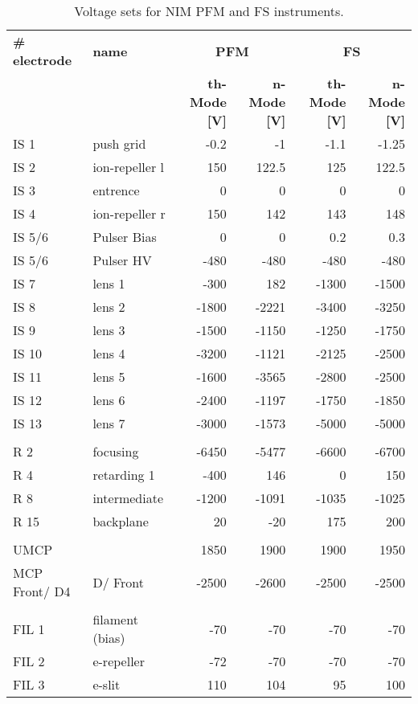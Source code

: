 	\begin{table}[H]
		\centering
		\begin{tabular}{|ll|rrrr|}
			\hline
			\textbf{\# electrode} & \textbf{name}   & \multicolumn{2}{c}{\textbf{PFM}} & \multicolumn{2}{c|}{\textbf{FS}} \\
			& & \textbf{th-Mode [V]} & \textbf{n-Mode [V]} & \textbf{th-Mode  [V]} & \textbf{n-Mode [V]} \\
			\hline
			IS 1          & push grid       &  -0.2 &    -1 &  -1.1 & -1.25 \\
			IS 2          & ion-repeller l  &   150 & 122.5 &   125 & 122.5 \\
			IS 3          & entrence        &    0 &      0 &     0 &     0 \\
			IS 4          & ion-repeller r  &   150 &   142 &   143 &   148 \\
			IS 5/6        & Pulser Bias     &     0 &     0 &   0.2 &   0.3 \\
			IS 5/6        & Pulser HV       &  -480 &  -480 &  -480 &  -480 \\
			IS 7          & lens 1          &  -300 &   182 & -1300 & -1500 \\
			IS 8          & lens 2          & -1800 & -2221 & -3400 & -3250 \\
			IS 9          & lens 3          & -1500 & -1150 & -1250 & -1750 \\
			IS 10         & lens 4          & -3200 & -1121 & -2125 & -2500 \\
			IS 11         & lens 5          & -1600 & -3565 & -2800 & -2500 \\
			IS 12         & lens 6          & -2400 & -1197 & -1750 & -1850 \\
			IS 13         & lens 7          & -3000 & -1573 & -5000 & -5000 \\
						  &                 &       &       &       &       \\
			R 2           & focusing        & -6450 & -5477 & -6600 & -6700 \\
			R 4           & retarding 1     &  -400 &   146 &     0 &   150 \\
			R 8           & intermediate    & -1200 & -1091 & -1035 & -1025 \\
			R 15          & backplane       &    20 &   -20 &   175 &   200 \\
						  &                 &       &       &       &       \\
			UMCP          &                 &  1850 &  1900 &  1900 &  1950 \\
			MCP Front/ D4 & D/ Front        & -2500 & -2600 & -2500 & -2500 \\
						  &                 &       &       &       &       \\
			FIL 1         & filament (bias) &   -70 &   -70 &   -70 &   -70 \\
			FIL 2         & e-repeller      &   -72 &   -70 &   -70 &   -70 \\
			FIL 3         & e-slit          &   110 &   104 &    95 &   100 \\
			\hline
		\end{tabular}
		\caption{Voltage sets for NIM PFM and FS instruments.}
		\label{tab:voltageSets}
	\end{table}